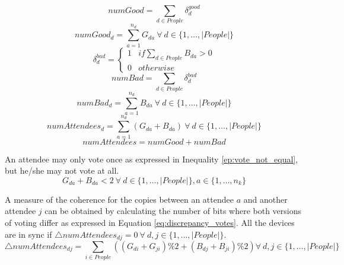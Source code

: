 \begin{equation} \label{eq:total_good_votes}
	numGood  = \sum_{d \in People} \delta^{good}_{d}
\end{equation}
\begin{equation} \label{eq:local_total_good_votes}
	numGood_{d}  = \sum^{n_{d}}_{a=1} G_{da} ~ \forall ~ d \in \{1,\dots, |People|\}
\end{equation}
\begin{equation} \label{attendee_voted_bad}
	\delta^{bad}_{d} = \left\{\begin{array}{ll}
		1 & if \sum_{d \in People} B_{da} > 0\\
		0 & otherwise
	\end{array}
	\right.
\end{equation}
\begin{equation} \label{eq:total_bad_votes}
	numBad  = \sum_{d \in People} \delta^{bad}_{d}
\end{equation}
\begin{equation} \label{eq:local_total_bad_votes}
	numBad_{d}  = \sum^{n_{d}}_{a=1} B_{da} ~ \forall ~ d \in \{1,\dots, |People|\}
\end{equation}
\begin{equation} \label{eq:num_votes}
	numAttendees_{d}  = \sum^{n_{d}}_{a=1} (G_{da} + B_{da}) ~ \forall ~ d \in \{1,\dots, |People|\}
\end{equation}
\begin{equation} \label{eq:total_num_votes}
	numAttendees  = numGood + numBad
\end{equation}

An attendee may only vote once as expressed in Inequality \ref{ep:vote_not_equal}, but he/she may not vote at all.
\begin{equation} \label{ep:vote_not_equal}
	G_{da} + B_{da} < 2 ~ \forall ~ d \in \{1,\dots, |People|\}, a \in \{1,\dots, n_{k}\}
\end{equation}

A measure of the coherence for the copies between an attendee $a$ and another attendee $j$ can be obtained by calculating the number of bits where both versions of voting differ as expressed in Equation \ref{eq:discrepancy_votes}. All the devices are in sync if $\bigtriangleup numAttendees_{dj} = 0 ~ \forall ~ d, j \in \{1,\dots, |People|\}$.
\begin{equation} \label{eq:discrepancy_votes}
	\bigtriangleup numAttendees_{dj} = \sum_{i \in People} ((G_{di} + G_{ji}) \% 2 + (B_{dj} + B_{ji}) \% 2) \forall ~ d, j \in \{1,\dots, |People|\}
\end{equation}

